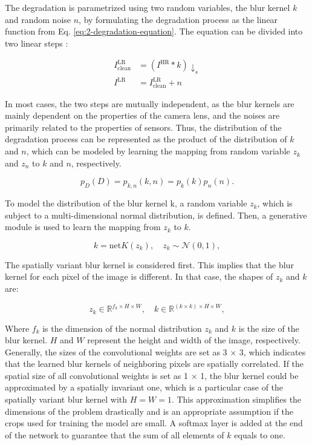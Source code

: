     
    The degradation is parametrized using two random variables, the blur kernel $k$ and random noise $n$, by formulating the degradation process as the linear function from Eq. \ref{eq:2-degradation-equation}.
    The equation can be divided into two linear steps \cite{zhu2020unpaired}: 

    \begin{equation}
        \begin{aligned}
                I^{\text{LR}}_{\text{clean}} &= (I^{\text{HR}} * k) \downarrow_s \\
                I^{\text{LR}} &= I^{\text{LR}}_{\text{clean}} + n
        \end{aligned}
    \end{equation}
    
    In most cases, the two steps are mutually independent, as the blur kernels are mainly dependent on the properties of the camera lens, and the noises are primarily related to the properties of sensors. 
    Thus, the distribution of the degradation process can be represented as the product of the distribution of $k$ and $n$, which can be modeled by learning the mapping from random variable $z_k$ and $z_n$ to $k$ and $n$, respectively.


    \begin{equation}
        p_{D}(D) = p_{k,n}(k, n) = p_{k}(k)p_{n}(n).
    \end{equation}

    To model the distribution of the blur kernel k, a random variable $z_k$, which is subject to a multi-dimensional normal distribution, is defined. 
    Then, a generative module is used to learn the mapping from $z_k$ to $k$. 

    \begin{equation}
        k = \text{net}K(z_k), \quad z_k \sim \mathcal{N}(0,1),
    \end{equation}

    The spatially variant blur kernel is considered first. This implies that the blur kernel for each pixel of the image is different. In that case, the shapes of $z_k$ and $k$ are:

    \begin{equation}
        z_k \in \mathbb{R}^{f_k \times H \times W}, \quad k \in \mathbb{R}^{(k \times k) \times H \times W},
    \end{equation}

    Where $f_k$ is the dimension of the normal distribution $z_k$ and $k$ is the size of the blur kernel. $H$ and $W$ represent the height and width of the image, respectively.
    Generally, the sizes of the convolutional weights are set as 3 × 3, which indicates that the learned blur kernels of neighboring pixels are spatially correlated.
    If the spatial size of all convolutional weights is set as 1 × 1, the blur kernel could be approximated by a spatially invariant one, which is a particular case of the spatially variant blur kernel with $H = W = 1$.
    This approximation simplifies the dimensions of the problem drastically and is an appropriate assumption if the crops used for training the model are small.
    A softmax layer is added at the end of the network to guarantee that the sum of all elements of $k$ equals to one.
    
